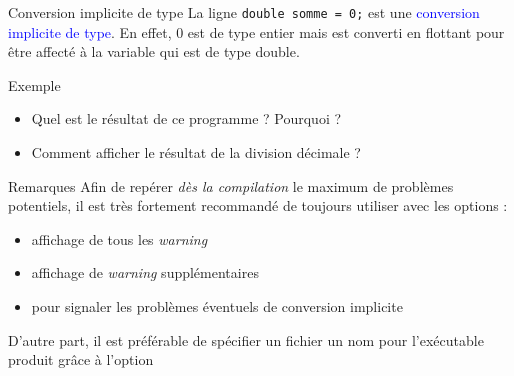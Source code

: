 \documentclass[10pt]{beamer}
\begin{document}
\begin{frame}[fragile]{\Ctitle}{\stitle}
	
	\begin{block}{Conversion implicite de type}
		La ligne \texttt{double somme = 0;} est une \textcolor{blue}{conversion implicite de type}. En effet, 0 est de type entier mais est converti en flottant pour être affecté à la variable  qui est de type double.
	\end{block}
\end{frame}

\begin{frame}[fragile]{\Ctitle}{\stitle}
	\begin{exampleblock}{Exemple}
	\begin{itemize}
	\item<2-> Quel est le résultat de ce programme ? Pourquoi ?
	\item<3-> Comment afficher le résultat de la division décimale ?
	\end{itemize}
	\end{exampleblock}
\end{frame}

\begin{frame}{\Ctitle}{\stitle}
	\begin{block}{Remarques}
		Afin de repérer \textit{dès la compilation} le maximum de problèmes potentiels, il est \textcolor{BrickRed}{très fortement recommandé} de toujours utiliser  avec les options :
		\begin{itemize}
			\item<2-> affichage de tous les \textit{warning}
			\item<3-> affichage de \textit{warning} supplémentaires
			\item<4-> pour signaler les problèmes éventuels de conversion implicite
		\end{itemize}
		 D'autre part, il est préférable de spécifier un fichier un nom pour l'exécutable produit grâce à l'option 
	\end{block}
\end{frame}
\end{document}
